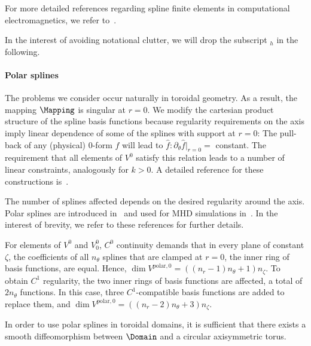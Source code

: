 \documentclass[%
 reprint,
 superscriptaddress,
 amsmath,amssymb,
 aps, nofootinbib, floatfix]{revtex4-2}
\begin{document}
For more detailed references regarding spline finite elements in computational electromagnetics, we refer to~\citep{buffa_isogeometric_2010, campos-pinto_broken-feec_2024}.

\begin{remark}
    In the interest of avoiding notational clutter, we will drop the subscript $_h$ in the following.
\end{remark}

\paragraph{Polar splines}
The problems we consider occur naturally in toroidal geometry. As a result, the mapping $\Mapping$ is singular at $r = 0$. We modify the cartesian product structure of the spline basis functions because regularity requirements on the axis imply linear dependence of some of the splines with support at $r = 0$: The pull-back of any (physical) 0-form $f$ will lead to $\hat f: \partial_\theta \hat f \big |_{r = 0} = $ constant. The requirement that all elements of $V^0$ satisfy this relation leads to a number of linear constraints, analogously for $k>0$. A detailed reference for these constructions is~\citep[Chapter 5]{holderied_struphy_2022}.

The number of splines affected depends on the desired regularity around the axis. Polar splines are introduced in~\citep{toshniwal_multi-degree_2017, toshniwal_isogeometric_2021, patrizi_isogeometric_2025} and used for MHD simulations in~\citep{holderied_magneto-hydrodynamic_2022}. In the interest of brevity, we refer to these references for further details.

\begin{example}
    For elements of $V^0$ and $V^0_{0}$, $C^0$ continuity demands that in every plane of constant $\zeta$, the coefficients of all $n_\theta$ splines that are clamped at $r = 0$, the inner ring of basis functions, are equal. Hence, $\dim V^{\mathrm{polar},0} = ((n_r - 1) n_\theta + 1) n_\zeta$.
    To obtain $C^1$ regularity, the two inner rings of basis functions are affected, a total of $2 n_\theta$ functions. In this case, three $C^1$-compatible basis functions are added to replace them, and $\dim V^{\mathrm{polar},0} = ((n_r - 2) n_\theta + 3) n_\zeta$.
\end{example}
In order to use polar splines in toroidal domains, it is sufficient that there exists a smooth diffeomorphism between $\Domain$ and a circular axisymmetric torus.    
\end{document}
